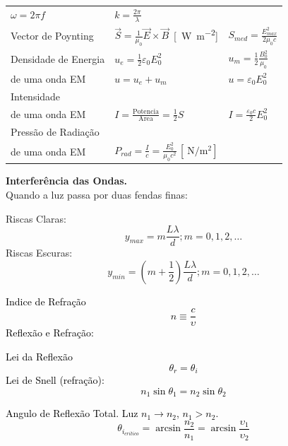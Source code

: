 \documentclass[a4paper,10pt]{extarticle} %
\newcommand{\mybox}[2]{
    \begin{tcolorbox}[colback=lightblue!5!white,colframe=lightblue!75!black,boxsep=1pt,arc=0pt,outer arc=0pt,title={\textcolor{black}{#1}}]
        \textcolor{black}{#2}
    \end{tcolorbox}
}
\begin{document}
\begin{multicols}{2}
{\begin{tabular}{lll}
        $\omega = 2 \pi f$ & $k = \frac{2 \pi}{\lambda}$ & \\ 
        Vector de Poynting &      $\vec{S} = \frac{1}{\mu_0}\vec{E} \times \vec{B}$ \,[\SI{}{\watt\per\meter\squared}] & $S_{med}= \frac{E_{max}^2}{2\mu_0 c}$ \\ 
        \hline Densidade de Energia & $u_e=\frac{1}{2}\varepsilon_0 E_0^2$ & $u_m=\frac{1}{2}\frac{B_0^2}{\mu_0}$ \\
        de uma onda EM &  $u= u_e +u_m$ & $u= \varepsilon_0 E_0^2$\\
        \hline Intensidade  & &\\
        de uma onda EM & $I = \frac{\mathrm{Potencia}}{\mathrm{Area}} = \frac{1}{2}S$ & $I = \frac{\varepsilon_0 c}{2} E_0^2$ \\
        \hline Pressão de Radiação  & &\\
        de uma onda EM & $P_{rad} = \frac{I}{c} = \frac{ E_0^2}{\mu_0 c^2 } \,[\SI{}{\newton\per\meter\squared}] $
    \end{tabular} 
    {\bf Interferência das Ondas.}\\
  Quando a luz passa por duas fendas finas:
  \begin{multicols}{2}
    Riscas Claras:
    \begin{equation*}
      y_{max} = m\frac{L \lambda}{d}; m=0,1,2,\ldots
    \end{equation*}
    Riscas Escuras:
    \begin{equation*}
      y_{min} = (m+\frac{1}{2})\frac{L \lambda}{d}; m=0,1,2,\ldots
    \end{equation*}
  \end{multicols}
}
\mybox{Optica Geométrica}{
    Indice de Refração
    \begin{equation}
      n \equiv \frac{c}{\upsilon}
    \end{equation}
  Reflexão e Refração:
  \begin{multicols}{2}
    Lei da Reflexão
    \begin{equation*}
      \theta_r= \theta_i 
    \end{equation*}
    Lei de Snell (refração):
    \begin{equation*}
      n_1 \sin{\theta_1} = n_2 \sin{\theta_2}
    \end{equation*}
  \end{multicols}
   Angulo de Reflexão Total. Luz $n_1 \to n_2$, $n_1 > n_2$.
    \begin{equation}
      \theta_{i_{critico}} = \arcsin{\frac{n_2}{n_1}} = \arcsin{\frac{\upsilon_1}{\upsilon_2}}
    \end{equation}
}
\end{multicols}
\end{document}
